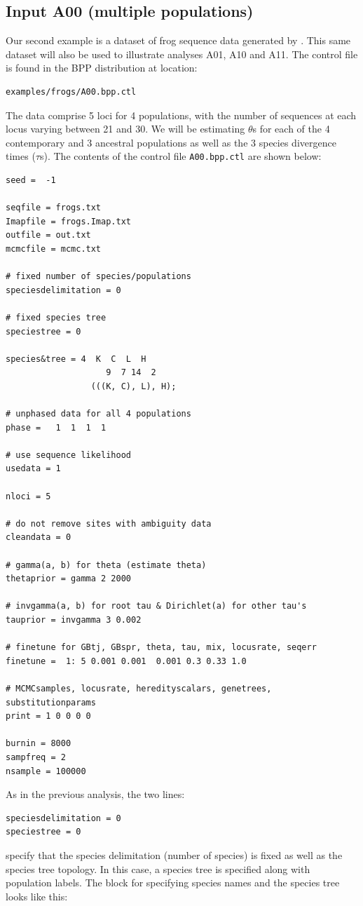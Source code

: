 \documentclass[a4paper]{book}
\numberwithin{equation}{section} \renewcommand{\baselinestretch}{0.55}
\begin{document}
\subsection{Input A00 (multiple populations)}
Our second example is a dataset of frog sequence data generated by \cite{Zhou2012}.
This same dataset will also be used to illustrate analyses A01, A10 and A11.
The control file is found in the BPP distribution at location:
\begin{verbatim}
examples/frogs/A00.bpp.ctl
\end{verbatim}
The data comprise 5 loci for 4 populations, with the number of sequences at each locus varying
between 21 and 30. We will be estimating $\theta$s for each of the 4 contemporary and 3 ancestral populations
as well as the 3 species divergence times ($\tau$s). The contents of the control file
\texttt{A00.bpp.ctl} are shown below:

\begin{verbatim}
seed =  -1

seqfile = frogs.txt
Imapfile = frogs.Imap.txt
outfile = out.txt
mcmcfile = mcmc.txt

# fixed number of species/populations
speciesdelimitation = 0 

# fixed species tree
speciestree = 0

species&tree = 4  K  C  L  H
                    9  7 14  2
                 (((K, C), L), H);

# unphased data for all 4 populations
phase =   1  1  1  1

# use sequence likelihood                  
usedata = 1

nloci = 5  

# do not remove sites with ambiguity data
cleandata = 0    

# gamma(a, b) for theta (estimate theta)
thetaprior = gamma 2 2000 

# invgamma(a, b) for root tau & Dirichlet(a) for other tau's
tauprior = invgamma 3 0.002 

# finetune for GBtj, GBspr, theta, tau, mix, locusrate, seqerr
finetune =  1: 5 0.001 0.001  0.001 0.3 0.33 1.0  

# MCMCsamples, locusrate, heredityscalars, genetrees, substitutionparams
print = 1 0 0 0 0   

burnin = 8000
sampfreq = 2
nsample = 100000
\end{verbatim}

\noindent
As in the previous analysis, the two lines:
\begin{verbatim}
speciesdelimitation = 0 
speciestree = 0
\end{verbatim}
specify that the species delimitation (number of species) is fixed as
well as the species tree topology. In this case,
a species tree is specified along with population labels.
The block for specifying species names
and the species tree looks like this:
\end{document}
